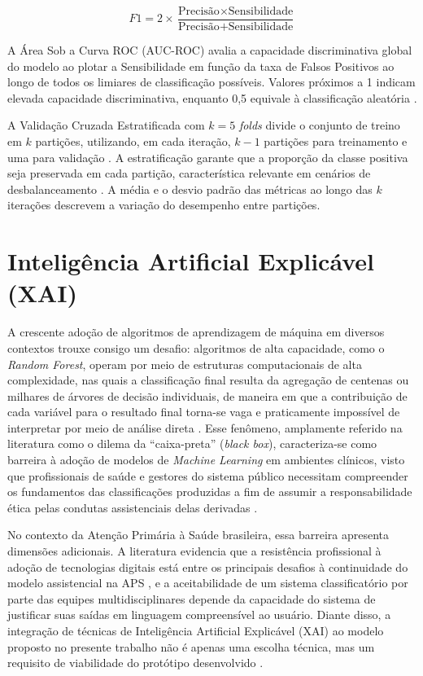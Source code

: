 \begin{equation}F1 = 2 \times \frac{\text{Precisão} \times \text{Sensibilidade}}{\text{Precisão} + \text{Sensibilidade}}
\end{equation}

\noindent A Área Sob a Curva ROC (AUC-ROC) avalia a capacidade discriminativa global do modelo ao plotar a Sensibilidade em função da taxa de Falsos Positivos ao longo de todos os limiares de classificação possíveis. Valores próximos a 1 indicam elevada capacidade discriminativa, enquanto 0,5 equivale à classificação aleatória \cite{fawcett2006introduction, powers2020evaluation}.

A Validação Cruzada Estratificada com $k = 5$ \textit{folds} divide o conjunto de treino em $k$ partições, utilizando, em cada iteração, $k-1$ partições para treinamento e uma para validação \cite{pedregosa2011scikit}. A estratificação garante que a proporção da classe positiva seja preservada em cada partição, característica relevante em cenários de desbalanceamento \cite{pertiwi2020comparison}. A média e o desvio padrão das métricas ao longo das $k$ iterações descrevem a variação do desempenho entre partições.


\section{Inteligência Artificial Explicável (XAI)} \label{sec:xai}

A crescente adoção de algoritmos de aprendizagem de máquina em diversos contextos trouxe consigo um desafio: algoritmos de alta capacidade, como o \textit{Random Forest}, operam por meio de estruturas computacionais de alta complexidade, nas quais a classificação final resulta da agregação de centenas ou milhares de árvores de decisão individuais, de maneira em que a contribuição de cada variável para o resultado final torna-se vaga e praticamente impossível de interpretar por meio de análise direta \cite{salih2025perspective}. Esse fenômeno, amplamente referido na literatura como o dilema da ``caixa-preta'' (\textit{black box}), caracteriza-se como barreira à adoção de modelos de \textit{Machine Learning} em ambientes clínicos, visto que profissionais de saúde e gestores do sistema público necessitam compreender os fundamentos das classificações produzidas a fim de assumir a responsabilidade ética pelas condutas assistenciais delas derivadas \cite{salih2025perspective}.

No contexto da Atenção Primária à Saúde brasileira, essa barreira apresenta dimensões adicionais. A literatura evidencia que a resistência profissional à adoção de tecnologias digitais está entre os principais desafios à continuidade do modelo assistencial na APS \cite{geremia2020atenccao}, e a aceitabilidade de um sistema classificatório por parte das equipes multidisciplinares depende da capacidade do sistema de justificar suas saídas em linguagem compreensível ao usuário. Diante disso, a integração de técnicas de Inteligência Artificial Explicável (XAI) ao modelo proposto no presente trabalho não é apenas uma escolha técnica, mas um requisito de viabilidade do protótipo desenvolvido \cite{geremia2020atenccao, salih2025perspective}.

